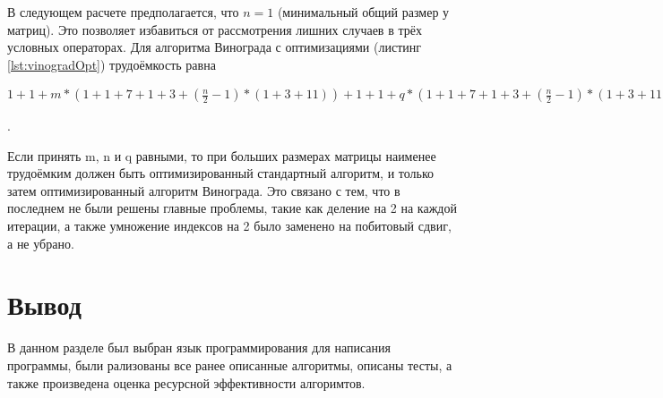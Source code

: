 В следующем расчете предполагается, что $n = 1$ (минимальный общий размер у матриц). Это позволяет избавиться от рассмотрения лишних случаев в трёх условных операторах. Для алгоритма Винограда с оптимизациями (листинг \ref{lst:vinogradOpt}) трудоёмкость равна $1 + 1 + m * (1 + 1 + 7 + 1 + 3 + (\frac{n}{2} - 1) * (1 + 3 + 11)) + 1 + 1 + q * (1 + 1 + 7 + 1 + 3 + (\frac{n}{2} - 1) * (1 + 3 + 11)) + 1 + 1 + m * (1 + 1 + 1 + 1 + q * (1 + 1 + 20 + 1 + 3 + (\frac{n}{2} - 1) * (1 + 3 + 21) + 3 + 
\begin{cases}
	0 & \text{, n четное, лучший случай (л. с.)}\\
	11 & \text{, n нечетное, худший случай (х. с.)} \\
\end{cases}
)) = 2 - 2m + \frac{15n}{2} + 2 - 2q + \frac{15n}{2} + 2 + m * (4 + q * (-13 + \frac{25n}{2} + 
\begin{cases}
	0 & \text{, л. с.}\\
	11 & \text{, х. с.} \\
\end{cases}
)) = \frac{25mnq}{2} - 
\begin{cases}
	13 & \text{, л. с.}\\
	2 & \text{, х. с.} \\
\end{cases} mq + \frac{15nq}{2} + \frac{15mn}{2} + 2m - 2q + 6$.

Если принять m, n и q равными, то при больших размерах матрицы наименее трудоёмким должен быть оптимизированный стандартный алгоритм, и только затем оптимизированный алгоритм Винограда. Это связано с тем, что в последнем не были решены главные проблемы, такие как деление на 2 на каждой итерации, а также умножение индексов на 2 было заменено на побитовый сдвиг, а не убрано.

\section{Вывод}

В данном разделе был выбран язык программирования для написания программы, были рализованы все ранее описанные алгоритмы, описаны тесты, а также произведена оценка ресурсной эффективности алгоримтов.